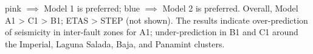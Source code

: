 \documentclass[landscape,a0paper,final,showframe]{baposter}
\begin{document}
\begin{poster}
{\begin{tabular}{ccc}
\end{tabular}
pink $\implies$ Model 1 is preferred; blue $\implies $ Model 2 is preferred. Overall, Model A1 > C1 > B1; ETAS > STEP (not shown). The results indicate over-prediction of seismicity in inter-fault zones for A1; under-prediction in B1 and C1 around the Imperial, Laguna Salada, Baja, and Panamint clusters.
  }%

\end{poster}
\end{document}
